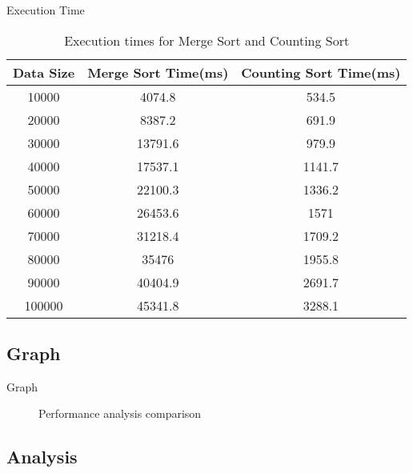 \documentclass{beamer}
\begin{document}
\begin{frame}{Execution Time}
	\begin{table}
		\centering
		\begin{tabular}{|c | c | c|} 
			\hline
			Data Size  & Merge Sort Time(ms)  & Counting Sort Time(ms) \\ [0.5ex]
			\hline
			10000 & 4074.8 & 534.5 \\
			\hline
			20000 & 8387.2 & 691.9 \\
			\hline
			30000 & 13791.6 & 979.9 \\
			\hline
			40000 & 17537.1 & 1141.7 \\
			\hline
			50000 & 22100.3 & 1336.2 \\
			\hline
			60000 & 26453.6 & 1571 \\
			\hline
			70000 & 31218.4 & 1709.2 \\
			\hline
			80000 & 35476 & 1955.8 \\
			\hline
			90000 & 40404.9 & 2691.7 \\
			\hline
			100000 & 45341.8 & 3288.1 \\
			\hline
		\end{tabular}
		\caption{Execution times for Merge Sort and Counting Sort}
	\end{table}
\end{frame}

\subsection{Graph}
\begin{frame}{Graph}
	\begin{figure}
		\centering
		\caption{Performance analysis comparison}

	\end{figure}
	
\end{frame}

		
\subsection{Analysis}
\end{document}
